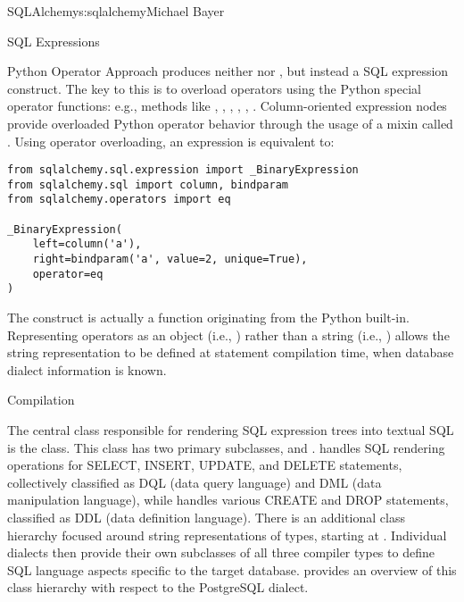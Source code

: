 \begin{aosachapter}{SQLAlchemy}{s:sqlalchemy}{Michael Bayer}
\begin{aosasect1}{SQL Expressions}
\begin{aosasect2}{Python Operator Approach}
produces neither  nor , but instead a SQL expression
construct. The key to this is to overload operators using the Python special
operator functions: e.g., methods like , ,
, , , . Column-oriented
expression nodes provide overloaded Python operator behavior through the usage
of a mixin called . Using operator overloading, an
expression  is equivalent to:

\begin{verbatim}
from sqlalchemy.sql.expression import _BinaryExpression
from sqlalchemy.sql import column, bindparam
from sqlalchemy.operators import eq

_BinaryExpression(
    left=column('a'),
    right=bindparam('a', value=2, unique=True),
    operator=eq
)
\end{verbatim}

The  construct is actually a function originating from the Python
 built-in.  Representing operators as an object (i.e.,
) rather than a string (i.e., \code{=}) allows the string
representation to be defined at statement compilation time, when database
dialect information is known.

\end{aosasect2}

\begin{aosasect2}{Compilation}

The central class responsible for rendering SQL expression trees into textual
SQL is the  class.  This class has two primary subclasses,  and
.   handles SQL rendering operations for SELECT, INSERT,
UPDATE, and DELETE statements, collectively classified as DQL (data query language) and
DML (data manipulation language), while  handles various CREATE and
DROP statements, classified as DDL (data definition language).
There is an additional class hierarchy focused around
string representations of types, starting at . Individual
dialects then provide their own subclasses of all three compiler types
to define SQL language aspects specific to the target database.
 provides an overview of this class hierarchy with respect to the
PostgreSQL dialect.



\end{aosasect2}
\end{aosasect1}
\end{aosachapter}
